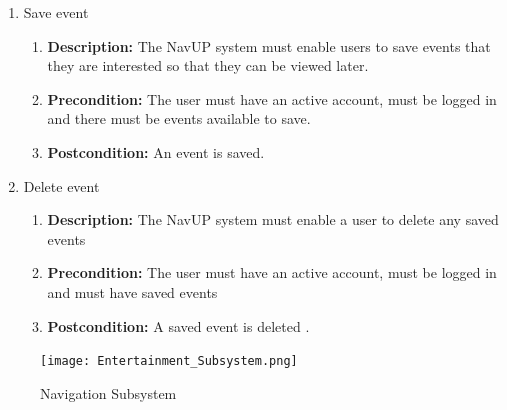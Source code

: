 \documentclass{article}
\begin{document}
\begin{enumerate}
\begin{enumerate}
		\item Save event
		\begin{enumerate}
			\item \textbf{Description:} The NavUP system must enable users to save events that they are interested so that they can be viewed later.
			\item \textbf{Precondition:} The user must have an active account, must be logged in and there must be events available to save.
			\item \textbf{Postcondition:} An event is saved.\newline
		\end{enumerate}
		
		\item Delete event
		\begin{enumerate}
			\item \textbf{Description:} The NavUP system must enable a user to delete any saved events
			\item \textbf{Precondition:} The user must have an active account, must be logged in and must have saved events
			\item \textbf{Postcondition:} A saved event is deleted .\newline
		\end{enumerate}
	\end{enumerate}
	\begin{figure}[h!]
		\texttt{[image: Entertainment\_Subsystem.png]}
		\caption{Navigation Subsystem}	
	\end{figure}	
	
	
	

\end{enumerate}
\end{document}

